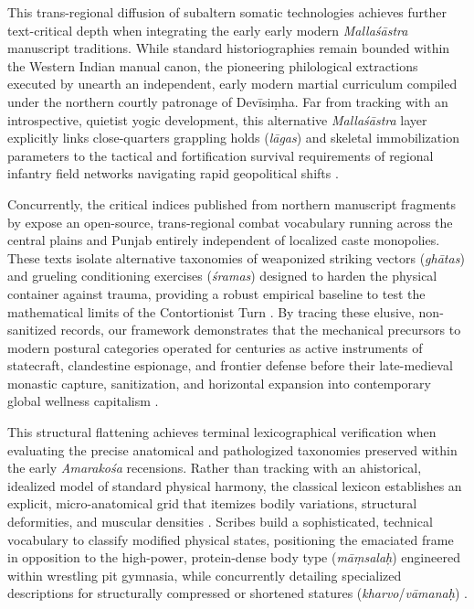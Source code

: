 \documentclass[11pt,twoside,letterpaper]{article}
\begin{document}
This trans-regional diffusion of subaltern somatic technologies achieves further text-critical depth when integrating the early early modern \textit{Mallaśāstra} manuscript traditions. While standard historiographies remain bounded within the Western Indian manual canon, the pioneering philological extractions executed by \citet{Kulkarni1959} unearth an independent, early modern martial curriculum compiled under the northern courtly patronage of Devīsiṃha. Far from tracking with an introspective, quietist yogic development, this alternative \textit{Mallaśāstra} layer explicitly links close-quarters grappling holds (\textit{lāgas}) and skeletal immobilization parameters to the tactical and fortification survival requirements of regional infantry field networks navigating rapid geopolitical shifts \citep{Kulkarni1959}. 

Concurrently, the critical indices published from northern manuscript fragments by \citet{Kulkarni1974} expose an open-source, trans-regional combat vocabulary running across the central plains and Punjab entirely independent of localized caste monopolies. These texts isolate alternative taxonomies of weaponized striking vectors (\textit{ghātas}) and grueling conditioning exercises (\textit{śramas}) designed to harden the physical container against trauma, providing a robust empirical baseline to test the mathematical limits of the Contortionist Turn \citep{Kulkarni1974}. By tracing these elusive, non-sanitized records, our framework demonstrates that the mechanical precursors to modern postural categories operated for centuries as active instruments of statecraft, clandestine espionage, and frontier defense before their late-medieval monastic capture, sanitization, and horizontal expansion into contemporary global wellness capitalism \citep{Kulkarni1959, Kulkarni1974, Wujastyk2025}.

This structural flattening achieves terminal lexicographical verification when evaluating the precise anatomical and pathologized taxonomies preserved within the early \textit{Amarakośa} recensions. Rather than tracking with an ahistorical, idealized model of standard physical harmony, the classical lexicon establishes an explicit, micro-anatomical grid that itemizes bodily variations, structural deformities, and muscular densities \citep{Thomas2025}. Scribes build a sophisticated, technical vocabulary to classify modified physical states, positioning the emaciated frame in opposition to the high-power, protein-dense body type (\textit{māṃsalaḥ}) engineered within wrestling pit gymnasia, while concurrently detailing specialized descriptions for structurally compressed or shortened statures (\textit{kharvo}/\textit{vāmanaḥ}) \citep{MP_7}. 
\end{document}
